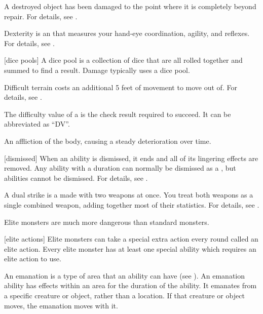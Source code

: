  A destroyed object has been damaged to the point where it is completely beyond repair.
For details, see .

 Dexterity is an  that measures your hand-eye coordination, agility, and reflexes.
For details, see .

[dice pools] A dice pool is a collection of dice that are all rolled together and summed to find a result.
Damage typically uses a dice pool.

 Difficult terrain costs an additional 5 feet of movement to move out of.
For details, see .

 The difficulty value of a  is the check result required to succeed.
It can be abbreviated as ``DV''.

 An affliction of the body, causing a steady deterioration over time.

[dismissed] When an ability is dismissed, it ends and all of its lingering effects are removed.
Any \magical ability with a duration can normally be dismissed as a , but  abilities cannot be dismissed.
For details, see .

 A dual strike is a  made with two weapons at once.
You treat both weapons as a single combined weapon, adding together most of their statistics.
For details, see .

 Elite monsters are much more dangerous than standard monsters.

[elite actions] Elite monsters can take a special extra action every round called an elite action.
Every elite monster has at least one special ability which requires an elite action to use.

 An emanation is a type of area that an ability can have (see ).
An emanation ability has effects within an area for the duration of the ability.
It emanates from a specific creature or object, rather than a location.
If that creature or object moves, the emanation moves with it.


